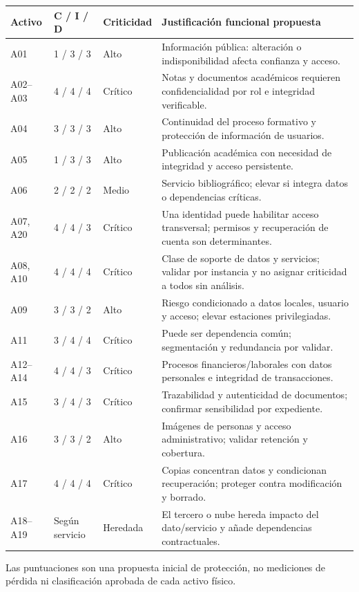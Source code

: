 \documentclass[10pt,a4paper]{article}
\newcommand{\cabecera}[1]{\textbf{#1}}
\begin{document}
\begin{TablaCompacta}
\begin{longtable}{P{26mm}P{20mm}P{23mm}P{90mm}}
\toprule\cabecera{Activo} & \cabecera{C / I / D} & \cabecera{Criticidad} & \cabecera{Justificación funcional propuesta}\\\midrule\endhead
A01 & 1 / 3 / 3 & Alto & Información pública: alteración o indisponibilidad afecta confianza y acceso.\\
A02--A03 & 4 / 4 / 4 & Crítico & Notas y documentos académicos requieren confidencialidad por rol e integridad verificable.\\
A04 & 3 / 3 / 3 & Alto & Continuidad del proceso formativo y protección de información de usuarios.\\
A05 & 1 / 3 / 3 & Alto & Publicación académica con necesidad de integridad y acceso persistente.\\
A06 & 2 / 2 / 2 & Medio & Servicio bibliográfico; elevar si integra datos o dependencias críticas.\\
A07, A20 & 4 / 4 / 3 & Crítico & Una identidad puede habilitar acceso transversal; permisos y recuperación de cuenta son determinantes.\\
A08, A10 & 4 / 4 / 4 & Crítico & Clase de soporte de datos y servicios; validar por instancia y no asignar criticidad a todos sin análisis.\\
A09 & 3 / 3 / 2 & Alto & Riesgo condicionado a datos locales, usuario y acceso; elevar estaciones privilegiadas.\\
A11 & 3 / 4 / 4 & Crítico & Puede ser dependencia común; segmentación y redundancia por validar.\\
A12--A14 & 4 / 4 / 3 & Crítico & Procesos financieros/laborales con datos personales e integridad de transacciones.\\
A15 & 3 / 4 / 3 & Crítico & Trazabilidad y autenticidad de documentos; confirmar sensibilidad por expediente.\\
A16 & 3 / 3 / 2 & Alto & Imágenes de personas y acceso administrativo; validar retención y cobertura.\\
A17 & 4 / 4 / 4 & Crítico & Copias concentran datos y condicionan recuperación; proteger contra modificación y borrado.\\
A18--A19 & Según servicio & Heredada & El tercero o nube hereda impacto del dato/servicio y añade dependencias contractuales.\\\bottomrule
\end{longtable}
\end{TablaCompacta}
Las puntuaciones son una propuesta inicial de protección, no mediciones de pérdida ni clasificación aprobada de cada activo físico.
\end{document}
